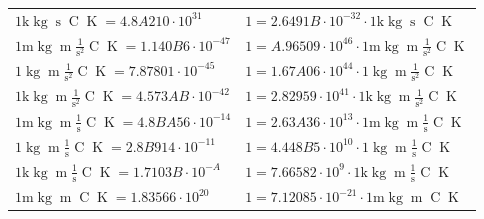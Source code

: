 \begin{center}
\begin{longtable}{l l}
{\color{gray}$1 \bm{\mathrm{ k}}\operatorname{kg}{}{\operatorname{s}}{\operatorname{C}}{\operatorname{K}} = 4.8A210\cdot10^{31} $}   & {\color{gray}$ 1 = 2.6491B\cdot10^{-32} \cdot 1 \bm{\mathrm{ k}}\operatorname{kg}{}{\operatorname{s}}{\operatorname{C}}{\operatorname{K}}$}  \\
{\color{gray}$1 \bm{\mathrm{ m}}\operatorname{kg}{\operatorname{m}}\frac1{\operatorname{s}^2}{\operatorname{C}}{\operatorname{K}} = 1.140B6\cdot10^{-47} $}   & {\color{gray}$ 1 = A.96509\cdot10^{46} \cdot 1 \bm{\mathrm{ m}}\operatorname{kg}{\operatorname{m}}\frac1{\operatorname{s}^2}{\operatorname{C}}{\operatorname{K}}$}  \\
{\color{black}$1 \bm{\mathrm{ }}\operatorname{kg}{\operatorname{m}}\frac1{\operatorname{s}^2}{\operatorname{C}}{\operatorname{K}} = 7.87801\cdot10^{-45} $}   & {\color{black}$ 1 = 1.67A06\cdot10^{44} \cdot 1 \bm{\mathrm{ }}\operatorname{kg}{\operatorname{m}}\frac1{\operatorname{s}^2}{\operatorname{C}}{\operatorname{K}}$}  \\
{\color{gray}$1 \bm{\mathrm{ k}}\operatorname{kg}{\operatorname{m}}\frac1{\operatorname{s}^2}{\operatorname{C}}{\operatorname{K}} = 4.573AB\cdot10^{-42} $}   & {\color{gray}$ 1 = 2.82959\cdot10^{41} \cdot 1 \bm{\mathrm{ k}}\operatorname{kg}{\operatorname{m}}\frac1{\operatorname{s}^2}{\operatorname{C}}{\operatorname{K}}$}  \\
{\color{gray}$1 \bm{\mathrm{ m}}\operatorname{kg}{\operatorname{m}}\frac1{\operatorname{s}}{\operatorname{C}}{\operatorname{K}} = 4.8BA56\cdot10^{-14} $}   & {\color{gray}$ 1 = 2.63A36\cdot10^{13} \cdot 1 \bm{\mathrm{ m}}\operatorname{kg}{\operatorname{m}}\frac1{\operatorname{s}}{\operatorname{C}}{\operatorname{K}}$}  \\
{\color{black}$1 \bm{\mathrm{ }}\operatorname{kg}{\operatorname{m}}\frac1{\operatorname{s}}{\operatorname{C}}{\operatorname{K}} = 2.8B914\cdot10^{-11} $}   & {\color{black}$ 1 = 4.448B5\cdot10^{10} \cdot 1 \bm{\mathrm{ }}\operatorname{kg}{\operatorname{m}}\frac1{\operatorname{s}}{\operatorname{C}}{\operatorname{K}}$}  \\
{\color{gray}$1 \bm{\mathrm{ k}}\operatorname{kg}{\operatorname{m}}\frac1{\operatorname{s}}{\operatorname{C}}{\operatorname{K}} = 1.7103B\cdot10^{-A} $}   & {\color{gray}$ 1 = 7.66582\cdot10^{9} \cdot 1 \bm{\mathrm{ k}}\operatorname{kg}{\operatorname{m}}\frac1{\operatorname{s}}{\operatorname{C}}{\operatorname{K}}$}  \\
{\color{gray}$1 \bm{\mathrm{ m}}\operatorname{kg}{\operatorname{m}}{}{\operatorname{C}}{\operatorname{K}} = 1.83566\cdot10^{20} $}   & {\color{gray}$ 1 = 7.12085\cdot10^{-21} \cdot 1 \bm{\mathrm{ m}}\operatorname{kg}{\operatorname{m}}{}{\operatorname{C}}{\operatorname{K}}$}  \\

\end{longtable}
\end{center}
